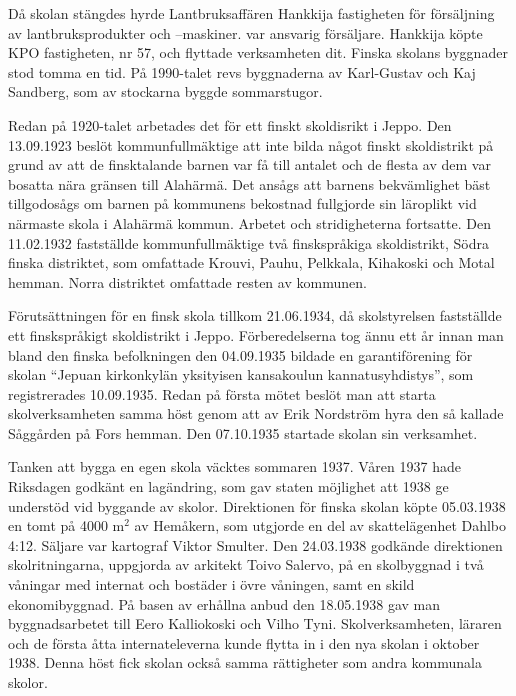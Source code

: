 Då skolan stängdes hyrde Lantbruksaffären Hankkija fastigheten för försäljning av lantbruksprodukter och –maskiner.  var ansvarig försäljare. Hankkija köpte KPO fastigheten, nr 57, och flyttade verksamheten dit. Finska skolans byggnader stod tomma en tid. På 1990-talet revs byggnaderna av Karl-Gustav och Kaj Sandberg, som av stockarna byggde sommarstugor.


%
Redan på 1920-talet arbetades det för ett finskt skoldisrikt i Jeppo.	Den 13.09.1923 beslöt kommunfullmäktige att inte bilda något finskt skoldistrikt på grund av att de finsktalande barnen var få till antalet och de flesta av dem var bosatta nära gränsen till Alahärmä. Det ansågs att barnens bekvämlighet bäst tillgodosågs om barnen på kommunens 	bekostnad fullgjorde sin läroplikt vid närmaste skola i Alahärmä kommun. Arbetet och stridigheterna fortsatte. Den 11.02.1932 fastställde kommunfullmäktige två finskspråkiga skoldistrikt, Södra finska distriktet, som omfattade Krouvi, Pauhu, Pelkkala, Kihakoski och Motal	hemman. Norra distriktet omfattade resten av kommunen.

Förutsättningen för en finsk skola tillkom 21.06.1934, då skolstyrelsen fastställde ett finskspråkigt skoldistrikt i Jeppo. Förberedelserna tog ännu ett år innan man bland den finska befolkningen den 04.09.1935	bildade en garantiförening för skolan ``Jepuan kirkonkylän yksityisen	kansakoulun kannatusyhdistys'', som registrerades 10.09.1935.	Redan på första mötet beslöt man att starta skolverksamheten samma höst genom att av Erik Nordström hyra den så kallade Såggården på	Fors hemman. Den 07.10.1935 startade skolan sin verksamhet.

Tanken att bygga en egen skola väcktes sommaren 1937. Våren 1937 hade Riksdagen godkänt en lagändring, som gav staten möjlighet att 1938 ge understöd vid byggande av skolor. Direktionen för finska skolan köpte 05.03.1938 en tomt på 4000 m$^2$ av Hemåkern, som utgjorde en del av skattelägenhet Dahlbo 4:12. Säljare var kartograf Viktor Smulter. Den	24.03.1938 godkände direktionen skolritningarna, uppgjorda av arkitekt Toivo Salervo, på en skolbyggnad i två våningar med internat och bostäder i övre våningen, samt en skild ekonomibyggnad. På basen av	erhållna anbud den 18.05.1938 gav man byggnadsarbetet till Eero Kalliokoski och Vilho Tyni. Skolverksamheten, läraren och de första åtta internateleverna kunde flytta in i den nya skolan i oktober 1938. Denna höst fick skolan också samma rättigheter som andra kommunala skolor.


